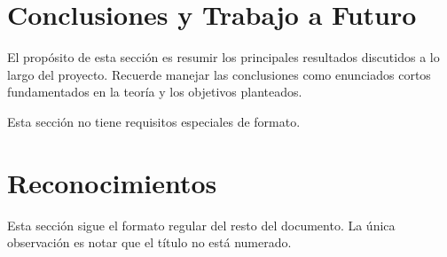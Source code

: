 \documentclass[10pt,twocolumn,letterpaper]{article}
\begin{document}
\section{Conclusiones y Trabajo a Futuro}
El propósito de esta sección es resumir los principales resultados discutidos a lo largo del proyecto. Recuerde manejar las conclusiones como enunciados cortos fundamentados en la teoría y los objetivos planteados.

Esta sección no tiene requisitos especiales de formato.

\section{Reconocimientos}
Esta sección sigue el formato regular del resto del documento. La única observación es notar que el título no está numerado.


\nocite{*} %

\clearpage


\end{document}
